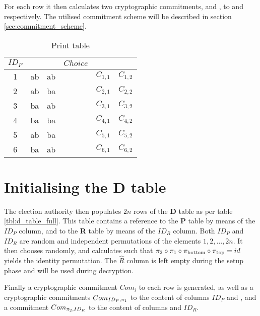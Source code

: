 For each row it then calculates two cryptographic commitments, \ctop{} and
\cbottom{}, to \ptop{} and \pbottom{} respectively. The utilised commitment
scheme will be described in section \ref{sec:commitment_scheme}.

\begin{table}
	\centering
	\begin{tabular}{|c|c|c|c|c|c|}
		\hline
		$ID_P$ & \ptop & \pbottom & $Choice$ & \ctop & \cbottom \\
		\hline
		1 & ab & ab & & $C_{1, 1}$ & $C_{1, 2}$ \\
		2 & ab & ba & & $C_{2, 1}$ & $C_{2, 2}$ \\
		3 & ba & ab & & $C_{3, 1}$ & $C_{3, 2}$ \\
		4 & ba & ba & & $C_{4, 1}$ & $C_{4, 2}$ \\
		5 & ab & ba & & $C_{5, 1}$ & $C_{5, 2}$ \\
		6 & ba & ab & & $C_{6, 1}$ & $C_{6, 2}$ \\
		\hline
	\end{tabular}
	\caption{Print table}
	\label{tbl:p_table_full}
\end{table}

\section{Initialising the \textbf{D} table}

The election authority then populates $2n$ rows of the \textbf{D} table as per
table \ref{tbl:d_table_full}. This table contains a reference to the \textbf{P}
table by means of the $ID_P$ column, and to the \textbf{R} table by means of
the $ID_R$ column. Both $ID_P$ and $ID_R$ are random and independent
permutations of the elements $1, 2, \ldots, 2n$. It then chooses \pone{}
randomly, and calculates \ptwo{} such that $\pi_2 \circ \pi_1 \circ \pi_{\text{bottom}}
\circ \pi_{\text{top}} = id$ yields the identity permutation.  The $\hat{R}$ column is
left empty during the setup phase and will be used during decryption. 

Finally a  cryptographic commitment $Com_i$ to each row is generated, as well
as a cryptographic commitments $Com_{ID_P, \pi_1}$ to the content of columns
$ID_P$ and \pone{}, and a commitment $Com_{\pi_2, ID_R}$ to the content of
columns \ptwo{} and $ID_R$.

